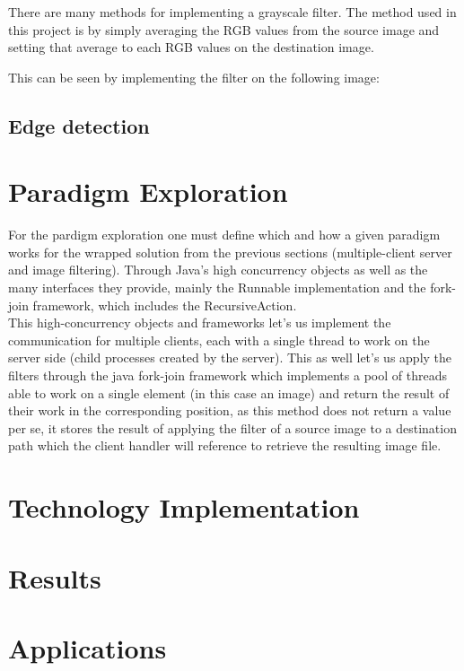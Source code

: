 \documentclass[a4paper,12pt]{article}
\begin{document}
	There are many methods for implementing a grayscale filter. The method used in this project is by simply averaging the RGB values from the source image and setting that average to each RGB values on the destination image.
	
	This can be seen by implementing the filter on the following image: 
	
	\subsection{Edge detection}
	
	
	
	\section{Paradigm Exploration}	
	
	For the pardigm exploration one must define which and how a given paradigm works for the wrapped solution from the previous sections (multiple-client server and image filtering). Through Java's high concurrency objects as well as the many interfaces they provide, mainly the Runnable implementation and the fork-join framework, which includes the RecursiveAction.\\
	
	This high-concurrency objects and frameworks let's us implement the communication for multiple clients, each with a single thread to work on the server side (child processes created by the server). This as well let's us apply the filters through the java fork-join framework which implements a pool of threads able to work on a single element (in this case an image) and return the result of their work in the corresponding position, as this method does not return a value per se, it stores the result of applying the filter of a source image to a destination path which the client handler will reference to retrieve the resulting image file.
	
	\section{Technology Implementation}

	

	\section{Results}
	
		
	
	\section{Applications}
\end{document}
